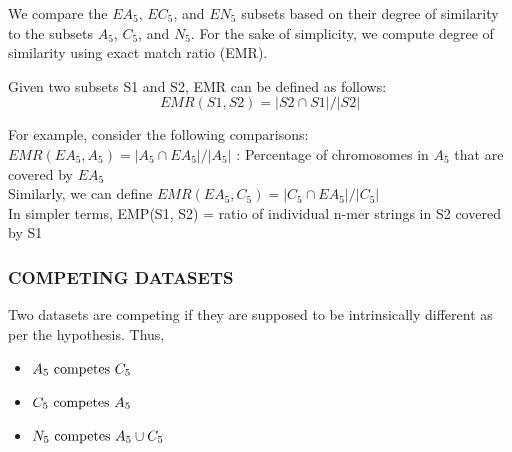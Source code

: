 \documentclass[12pt,a4paper]{article}
\begin{document}
	We compare the $EA_5$, $EC_5$, and $EN_5$ subsets based on their degree of similarity to the subsets $A_5$, $C_5$, and $N_5$. For the sake of simplicity, we compute degree of similarity using exact match ratio (EMR). \par
	Given two subsets S1 and S2, EMR can be defined as follows:
	\begin{equation}
		EMR(S1, S2) = |S2 \cap S1| / |S2|
		\label{eq-emr}
	\end{equation}
	
	For example, consider the following comparisons:\\
	$ EMR(EA_5, A_5) = |A_5 \cap EA_5| / |A_5| $ : Percentage of chromosomes in $A_5$ that are covered by $EA_5$ \\
	Similarly, we can define $ EMR(EA_5, C_5) = |C_5 \cap EA_5| / |C_5| $ \\
	In simpler terms, EMP(S1, S2) = ratio of individual n-mer strings in S2 covered by S1

	\subsubsection{COMPETING DATASETS} \label{sec:competing}
	Two datasets are competing if they are supposed to be intrinsically different as per the hypothesis.
	Thus,
	\begin{itemize}
	\item $A_5 \textnormal{ competes } C_5$
	\item $C_5 \textnormal{ competes } A_5$
	\item $N_5 \textnormal{ competes } A_5 \cup C_5$
	\end{itemize}
\end{document}
